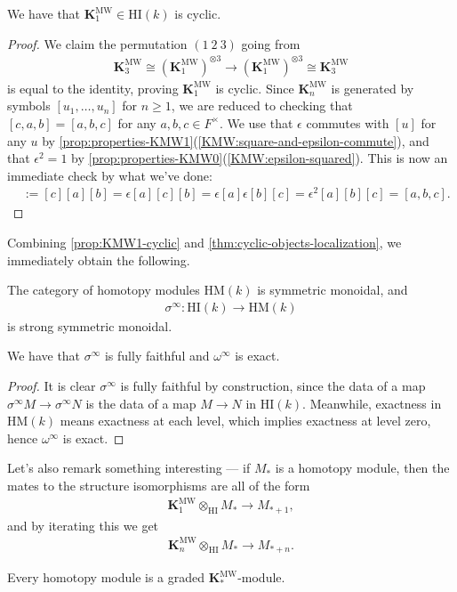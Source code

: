 \documentclass[11pt,openany]{book}
\providecommand{\HI}{\mathrm{HI}}
\providecommand{\HM}{\mathrm{HM}}
\providecommand{\KMW}{\mathbf{K}^\mathrm{MW}}
\begin{document}
\begin{proposition}\label{prop:KMW1-cyclic} 
We have that $\KMW_1 \in \HI(k)$ is cyclic.
\end{proposition}
\begin{proof} We claim the permutation $(1\ 2\ 3)$ going from
\begin{align*}
    \KMW_3 \cong (\KMW_1)^{\otimes3} \to (\KMW_1)^{\otimes 3} \cong \KMW_3
\end{align*}
is equal to the identity, proving $\KMW_1$ is cyclic. Since $\KMW_n$ is generated by symbols $[u_1, \ldots, u_n]$ for $n\ge 1$, we are reduced to checking that $[c,a,b] = [a,b,c]$ for any $a,b,c \in F^\times$. We use that $\epsilon$ commutes with $[u]$ for any $u$ by \autoref{prop:properties-KMW1}(\ref{KMW:square-and-epsilon-commute}), and that $\epsilon^2 = 1$ by \autoref{prop:properties-KMW0}(\ref{KMW:epsilon-squared}). This is now an immediate check by what we've done:
\begin{align*}
    [c,a,b] &:=[c][a][b] = \epsilon[a][c][b] = \epsilon[a]\epsilon[b][c] = \epsilon^2[a][b][c] = [a,b,c].
\end{align*}
\end{proof}

Combining \autoref{prop:KMW1-cyclic} and \autoref{thm:cyclic-objects-localization}, we immediately obtain the following.

\begin{corollary} The category of homotopy modules $\HM(k)$ is symmetric monoidal, and
\begin{align*}
    \sigma^\infty \colon \HI(k) \to \HM(k)
\end{align*}
is strong symmetric monoidal.
\end{corollary}

\begin{proposition} We have that $\sigma^\infty$ is fully faithful and $\omega^\infty$ is exact.
\end{proposition}
\begin{proof} It is clear $\sigma^\infty$ is fully faithful by construction, since the data of a map $\sigma^\infty M \to \sigma^\infty N$ is the data of a map $M \to N$ in $\HI(k)$. Meanwhile, exactness in $\HM(k)$ means exactness at each level, which implies exactness at level zero, hence $\omega^\infty$ is exact.
\end{proof}


Let's also remark something interesting --- if $M_\ast$ is a homotopy module, then the mates to the structure isomorphisms are all of the form
\begin{align*}
    \KMW_1 \otimes_\HI M_\ast \to M_{\ast+1},
\end{align*}
and by iterating this we get
\begin{align*}
    \KMW_n \otimes_\HI M_\ast \to M_{\ast+n}.
\end{align*}
%
\begin{remark} Every homotopy module is a graded $\KMW_\ast$-module.
\end{remark}
\end{document}
